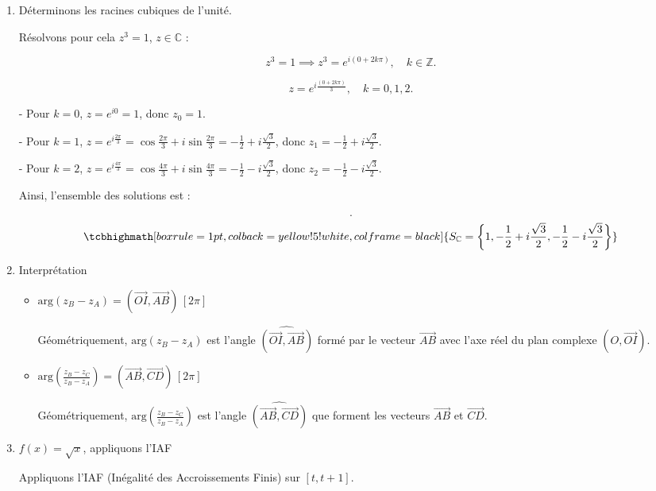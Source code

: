 \documentclass[12pt,a4paper]{article}
\begin{document}
\begin{enumerate}

\item Déterminons les racines cubiques de l'unité.

Résolvons pour cela $z^3 = 1$, $z \in \mathbb{C}$ :

\[
z^3 = 1 \implies z^3 = e^{i(0+2k\pi)}, \quad k \in \mathbb{Z}.
\]

\[
z = e^{i\frac{(0+2k\pi)}{3}}, \quad k = 0, 1, 2.
\]

- Pour $k = 0$, $z = e^{i0} = 1$, donc $z_0 = 1$.

- Pour $k = 1$, $z = e^{i\frac{2\pi}{3}} = \cos\frac{2\pi}{3} + i\sin\frac{2\pi}{3} = -\frac{1}{2} + i\frac{\sqrt{3}}{2}$, donc $z_1 = -\frac{1}{2} + i\frac{\sqrt{3}}{2}$.

- Pour $k = 2$, $z = e^{i\frac{4\pi}{3}} = \cos\frac{4\pi}{3} + i\sin\frac{4\pi}{3} = -\frac{1}{2} - i\frac{\sqrt{3}}{2}$, donc $z_2 = -\frac{1}{2} - i\frac{\sqrt{3}}{2}$.

Ainsi, l'ensemble des solutions est :

\[
.
\]
\[
\tcbhighmath[boxrule=1pt, colback=yellow!5!white, colframe=black]{S_{\mathbb{C}} = \left\{ 1, -\frac{1}{2} + i\frac{\sqrt{3}}{2}, -\frac{1}{2} - i\frac{\sqrt{3}}{2} \right\}
}
\]

\item Interprétation

\begin{itemize}
    \item $\text{arg}(z_B - z_A) = (\overrightarrow{OI}, \overrightarrow{AB}) \, [2\pi]$
    
    Géométriquement, $\text{arg}(z_B - z_A)$ est l'angle $\widehat{(\overrightarrow{OI}, \overrightarrow{AB})}$ formé par le vecteur $\overrightarrow{AB}$ avec l'axe réel du plan complexe $(O, \overrightarrow{OI})$.

    \item $\text{arg}\left(\frac{z_B - z_C}{z_B - z_A}\right) = (\overrightarrow{AB}, \overrightarrow{CD}) \, [2\pi]$
    
    Géométriquement, $\text{arg}\left(\frac{z_B - z_C}{z_B - z_A}\right)$ est l'angle $\widehat{(\overrightarrow{AB}, \overrightarrow{CD})}$ que forment les vecteurs $\overrightarrow{AB}$ et $\overrightarrow{CD}$.
\end{itemize}

\item $f(x) = \sqrt{x}$, appliquons l'IAF

Appliquons l'IAF (Inégalité des Accroissements Finis) sur $[t, t+1]$.


\end{enumerate}
\end{document}
